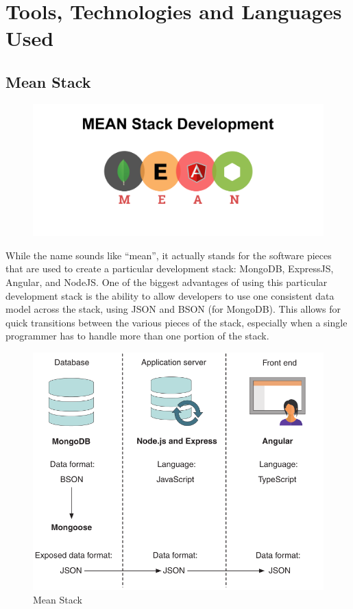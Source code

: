 

\chapter{Tools, Technologies and Languages Used}%
\label{chap:chapter_two}
\section{Mean Stack}
\begin{figure}[!ht]
    \center
    \includegraphics[scale=0.30]{assets/meanstack.png}
\end{figure}

While the name sounds like “mean”, it actually stands for the software pieces that are used to create a particular development stack: MongoDB, ExpressJS, Angular, and NodeJS. One of the biggest advantages of using this particular development stack is the ability to allow developers to use one consistent data model across the stack, using JSON and BSON (for MongoDB). This allows for quick transitions between the various pieces of the stack, especially when a single programmer has to handle more than one portion of the stack.

\begin{figure}[!ht]
    \center
    \includegraphics[scale=0.60]{assets/mean.png}
    \caption{Mean Stack}
    \label{fig:mean}
\end{figure}

